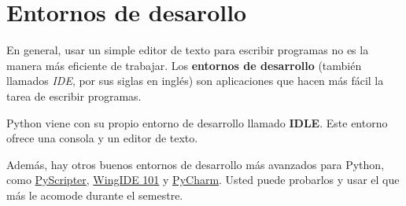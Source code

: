 \section{Entornos de desarollo}

En general, usar un simple editor de texto para escribir programas no es
la manera más eficiente de trabajar.
Los \textbf{entornos de desarrollo} (también llamados \emph{IDE}, por
sus siglas en inglés) son aplicaciones que hacen más fácil la tarea de
escribir programas.

Python viene con su propio entorno de desarrollo llamado \textbf{IDLE}.
Este entorno ofrece una consola y un editor de texto.

Además, hay otros buenos entornos de desarrollo más avanzados para
Python, como
\href{http://code.google.com/p/pyscripter/downloads/list}{PyScripter},
\href{http://www.wingware.com/downloads/wingide-101/3.2.12-1/binaries}{WingIDE 101} y
\href{http://www.jetbrains.com/pycharm/}{PyCharm}.
Usted puede probarlos y usar el que más le acomode durante el
semestre.

